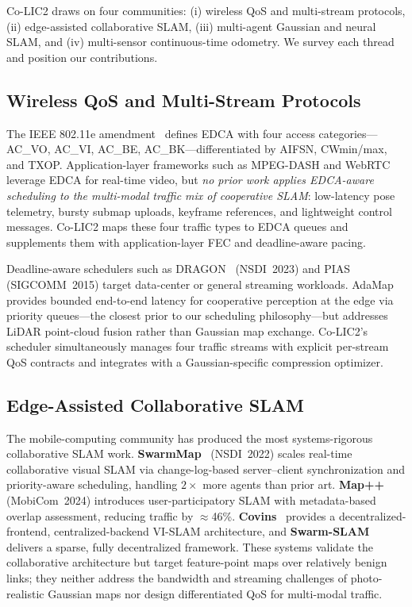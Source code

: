 
Co-LIC2 draws on four communities: (i) wireless QoS and multi-stream
protocols, (ii) edge-assisted collaborative SLAM, (iii) multi-agent Gaussian
and neural SLAM, and (iv) multi-sensor continuous-time odometry. We survey
each thread and position our contributions.

\subsection{Wireless QoS and Multi-Stream Protocols}

The IEEE 802.11e amendment~\cite{ieee80211e} defines EDCA with four access
categories---AC\_VO, AC\_VI, AC\_BE, AC\_BK---differentiated by AIFSN,
CWmin/max, and TXOP. Application-layer frameworks such as MPEG-DASH and
WebRTC leverage EDCA for real-time video, but \emph{no prior work
applies EDCA-aware scheduling to the multi-modal traffic mix of cooperative
SLAM}: low-latency pose telemetry, bursty submap uploads, keyframe references,
and lightweight control messages. Co-LIC2 maps these four traffic types to
EDCA queues and supplements them with application-layer FEC and deadline-aware
pacing.

Deadline-aware schedulers such as DRAGON~\cite{hou2023dragon} (NSDI~2023) and
PIAS~\cite{bai2015pias} (SIGCOMM~2015) target data-center or general streaming
workloads. AdaMap~\cite{liu2023adamap} provides bounded end-to-end latency
for cooperative perception at the edge via priority queues---the closest
prior to our scheduling philosophy---but addresses LiDAR point-cloud fusion
rather than Gaussian map exchange. Co-LIC2's scheduler simultaneously manages
four traffic streams with explicit per-stream QoS contracts and integrates
with a Gaussian-specific compression optimizer.

\subsection{Edge-Assisted Collaborative SLAM}

The mobile-computing community has produced the most systems-rigorous
collaborative SLAM work. \textbf{SwarmMap}~\cite{xu2022swarmmap} (NSDI~2022)
scales real-time collaborative visual SLAM via change-log-based server--client
synchronization and priority-aware scheduling, handling $2\times$ more agents
than prior art. \textbf{Map++}~\cite{zhang2024mapp} (MobiCom~2024) introduces
user-participatory SLAM with metadata-based overlap assessment, reducing
traffic by $\approx$46\%. \textbf{Covins}~\cite{schmuck2021covins} provides
a decentralized-frontend, centralized-backend VI-SLAM architecture, and
\textbf{Swarm-SLAM}~\cite{lajoie2024swarmslam} delivers a sparse, fully
decentralized framework. These systems validate the collaborative architecture
but target feature-point maps over relatively benign links; they neither
address the bandwidth and streaming challenges of photo-realistic Gaussian
maps nor design differentiated QoS for multi-modal traffic.

